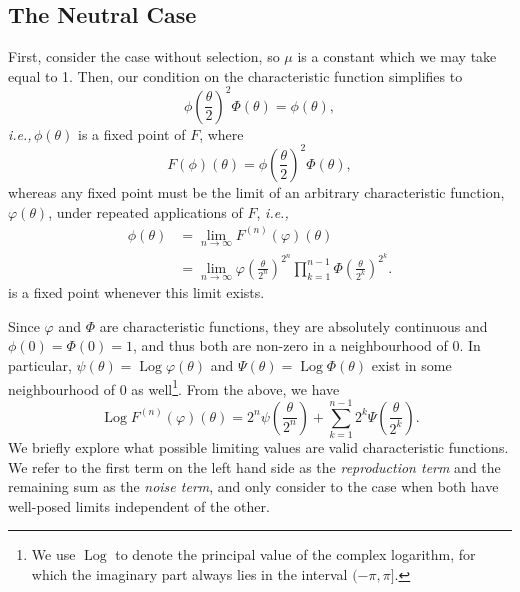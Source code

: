 \documentclass{article}
\newcommand{\ie}{\textit{i.e.,}\,}
\newcommand{\1}{\mathbbm{1}}
\DeclareMathOperator*{\Log}{Log}
\theoremstyle{remark}
\theoremstyle{definition}
\begin{document}
\subsection{The Neutral Case}

First, consider the case without selection, so $\mu$ is a constant
which we may take equal to 1.  Then, our condition on the characteristic function simplifies to
\begin{equation}\label{eq:CF_neutral}
	{\textstyle \phi\left(\frac{\theta}{2}\right)^{2}} \Phi(\theta) %
	= \phi(\theta) ,
\end{equation}
\ie $\phi(\theta)$ is a fixed point of $F$, where
 \[
	F(\phi)(\theta) = {\textstyle \phi\left(\frac{\theta}{2}\right)^{2}} \Phi(\theta),
\]
whereas any fixed point must be the limit of an arbitrary characteristic function, $\varphi(\theta)$, under repeated applications of $F$,
\ie
\begin{align*}
	\phi(\theta) 
    &= \lim_{n \to \infty} F^{(n)}(\varphi)(\theta) \\
    &= \lim_{n \to \infty} \varphi\left(\frac{\theta}{2^{n}}\right)^{2^{n}}\prod_{k=1}^{n-1}\Phi\left(\frac{\theta}{2^{k}}\right)^{2^{k}} .
\end{align*}
is a fixed point whenever this limit exists.  

Since $\varphi$ and $\Phi$ are characteristic functions, they are absolutely continuous and $\phi(0) = \Phi(0) = 1$, and thus both are non-zero in a neighbourhood of 0. In particular, $\psi(\theta) = \Log{\varphi}(\theta)$ and $\Psi(\theta) = \Log{\Phi(\theta)}$ exist in some neighbourhood of 0 as well\footnote{We use $\Log$ to denote the principal value of the complex logarithm, for which the imaginary part always lies in the interval $(-\pi,\pi]$.}.  From the above, we have
\[
	\Log{F^{(n)}(\varphi)(\theta)} = {\textstyle 2^{n} \psi\left(\frac{\theta}{2^{n}}\right)} 
		+ \sum_{k=1}^{n-1}  {\textstyle 2^{k} \Psi\left(\frac{\theta}{2^{k}}\right)}.
\]
We briefly explore what possible limiting values are valid characteristic functions.  We refer to the first term on the left hand side as the \emph{reproduction term} and the remaining sum as the \emph{noise term}, and only consider to the case when both have well-posed limits independent of the other.
\end{document}
